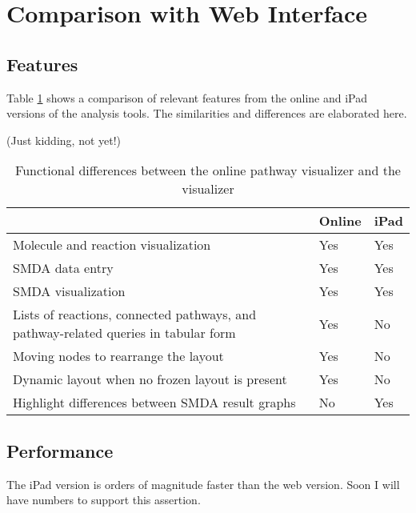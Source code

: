 \section{Comparison with \pathcasemaw Web Interface}
\label{sect:maw_comparison}

\subsection{Features}
\label{sect:maw_comparison_features}

Table \ref{fig:maw_comparison_table} shows a comparison of relevant features
from the online and iPad versions of the \pathcasemaw analysis tools. The
similarities and differences are elaborated here.

(Just kidding, not yet!)

\begin{table}[ht!]
\centering
\begin{tabular}{ | p{3in} | l | l | }
    \hline
                        & Online    & iPad \\ \hline

    Molecule and reaction visualization
                        & Yes       & Yes \\ \hline

    SMDA data entry     & Yes       & Yes \\ \hline

    SMDA visualization  & Yes       & Yes \\ \hline

    Lists of reactions, connected pathways, and pathway-related queries in
    tabular form
                        & Yes       & No \\ \hline

    Moving nodes to rearrange the layout
                        & Yes       & No \\ \hline

    Dynamic layout when no frozen layout is present
                        & Yes       & No \\ \hline

    Highlight differences between SMDA result graphs
                        & No        & Yes \\ \hline
\end{tabular}
    \label{fig:maw_comparison_table}
    \caption{Functional differences between the online \pathcasemaw pathway
    visualizer and the \mawapp visualizer}
\end{table}

\subsection{Performance}
\label{sect:maw_comparison_performance}

The iPad version is orders of magnitude faster than the web version. Soon I will
have numbers to support this assertion.
